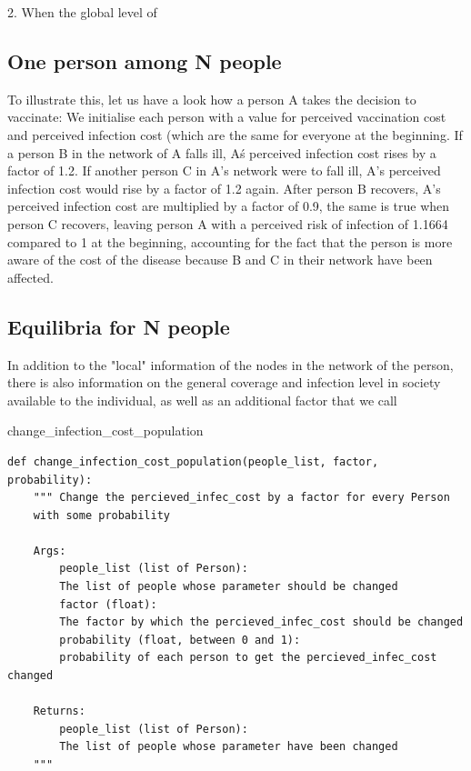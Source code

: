 \documentclass[11pt]{article}
\begin{document}
2. When the global level of 

\subsection{One person among N people}
To illustrate this, let us have a look how a person A takes the decision to vaccinate: 
We initialise each person with a value for perceived vaccination cost and perceived infection cost (which are the same for everyone at the beginning. 
If a person B in the network of A falls ill, A\'s perceived infection cost rises by a factor of 1.2. If another person C in A's network were to fall ill, A's perceived infection cost would rise by a factor of 1.2 again. After person B recovers, A's perceived infection cost are multiplied by a factor of 0.9, the same is true when person C recovers, leaving person A with a perceived risk of infection of 1.1664 compared to 1 at the beginning, accounting for the fact that the person is more aware of the cost of the disease because B and C in their network have been affected. 

\subsection{Equilibria for N people}
In addition to the "local" information of the nodes in the network of the person, there is also information on the general coverage and infection level in society available to the individual, as well as an additional factor that we call 

change\_infection\_cost\_population

\begin{small}
\begin{lstlisting}
def change_infection_cost_population(people_list, factor, probability):
    """ Change the percieved_infec_cost by a factor for every Person
    with some probability
    
    Args:
        people_list (list of Person): 
        The list of people whose parameter should be changed
        factor (float): 
        The factor by which the percieved_infec_cost should be changed
        probability (float, between 0 and 1): 
        probability of each person to get the percieved_infec_cost changed
    
    Returns:
        people_list (list of Person): 
        The list of people whose parameter have been changed
    """

\end{lstlisting}
\end{small}
\end{document}

